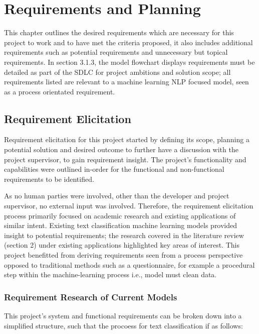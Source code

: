 \chapter{Requirements and Planning}

This chapter outlines the desired requirements which are necessary for this project to work and to have met the criteria proposed, it also includes additional requirements such as potential requirements and unnecessary but topical requirements. In section 3.1.3, the model flowchart displays requirements must be detailed as part of the SDLC for project ambitions and solution scope; all requirements listed are relevant to a machine learning NLP focused model, seen as a process orientated requirement.

\section{Requirement Elicitation}

Requirement elicitation for this project started by defining its scope, planning a potential solution and desired outcome to further have a discussion with the project supervisor, to gain requirement insight. The project’s functionality and capabilities were outlined in-order for the functional and non-functional requirements to be identified.

As no human parties were involved, other than the developer and project supervisor, no external input was involved. Therefore, the requirement elicitation process primarily focused on academic research and existing applications of similar intent. Existing text classification machine learning models provided insight to potential requirements; the research covered in the literature review (section 2) under existing applications highlighted key areas of interest. This project benefitted from deriving requirements seen from a process perspective opposed to traditional methods such as a questionnaire, for example a procedural step within the machine-learning process i.e., model must clean data.

\subsection{Requirement Research of Current Models}

This project's system and functional requirements can be broken down into a simplified structure, such that the procoess for text classification if as follows:

